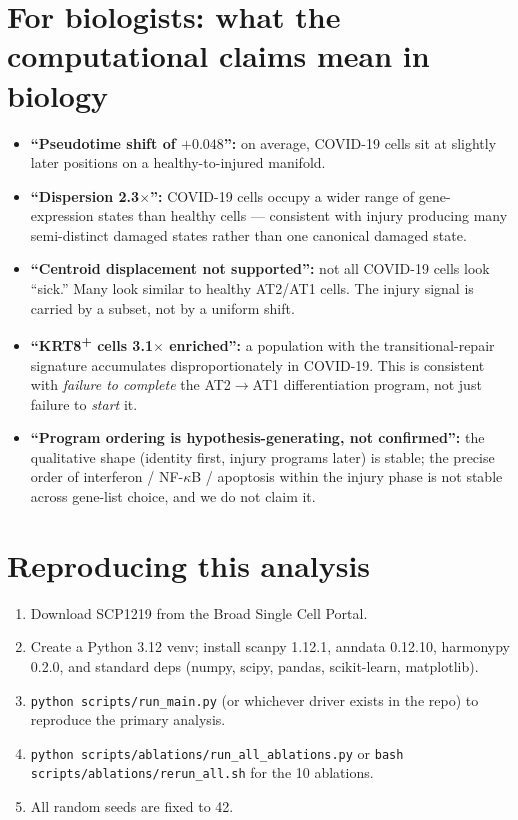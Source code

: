\documentclass[11pt]{article}
\begin{document}
\section{For biologists: what the computational claims mean in biology}

\begin{itemize}[nosep]
\item \textbf{``Pseudotime shift of $+0.048$'':} on average, COVID-19 cells sit at slightly later positions on a healthy-to-injured manifold.
\item \textbf{``Dispersion 2.3$\times$'':} COVID-19 cells occupy a wider range of gene-expression states than healthy cells --- consistent with injury producing many semi-distinct damaged states rather than one canonical damaged state.
\item \textbf{``Centroid displacement not supported'':} not all COVID-19 cells look ``sick.'' Many look similar to healthy AT2/AT1 cells. The injury signal is carried by a subset, not by a uniform shift.
\item \textbf{``KRT8\textsuperscript{+} cells 3.1$\times$ enriched'':} a population with the transitional-repair signature accumulates disproportionately in COVID-19. This is consistent with \emph{failure to complete} the AT2$\rightarrow$AT1 differentiation program, not just failure to \emph{start} it.
\item \textbf{``Program ordering is hypothesis-generating, not confirmed'':} the qualitative shape (identity first, injury programs later) is stable; the precise order of interferon / NF-$\kappa$B / apoptosis within the injury phase is not stable across gene-list choice, and we do not claim it.
\end{itemize}

\section{Reproducing this analysis}

\begin{enumerate}[nosep]
\item Download SCP1219 from the Broad Single Cell Portal.
\item Create a Python 3.12 venv; install scanpy 1.12.1, anndata 0.12.10, harmonypy 0.2.0, and standard deps (numpy, scipy, pandas, scikit-learn, matplotlib).
\item \texttt{python scripts/run\_main.py} (or whichever driver exists in the repo) to reproduce the primary analysis.
\item \texttt{python scripts/ablations/run\_all\_ablations.py} or \texttt{bash scripts/ablations/rerun\_all.sh} for the 10 ablations.
\item All random seeds are fixed to 42.
\end{enumerate}
\end{document}
